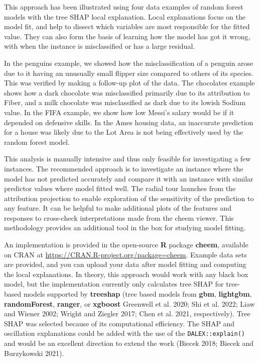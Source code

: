 \documentclass[11pt,twoside]{article}
\begin{document}
This approach has been illustrated using four data examples of random forest models with the tree SHAP local explanation. Local explanations focus on the model fit, and help to dissect which variables are most responsible for the fitted value. They can also form the basis of learning how the model has got it wrong, with when the instance is misclassified or has a large residual.

In the penguins example, we showed how the misclassification of a penguin arose due to it having an unusually small flipper size compared to others of its species. This was verified by making a follow-up plot of the data. The chocolates example shows how a dark chocolate was misclassified primarily due to its attribution to Fiber, and a milk chocolate was misclassified as dark due to its lowish Sodium value. In the FIFA example, we show how low Messi's salary would be if it depended on defensive skills. In the Ames housing data, an inaccurate prediction for a house was likely due to the Lot Area is not being effectively used by the random forest model.

This analysis is manually intensive and thus only feasible for investigating a few instances. The recommended approach is to investigate an instance where the model has not predicted accurately and compare it with an instance with similar predictor values where model fitted well. The radial tour launches from the attribution projection to enable exploration of the sensitivity of the prediction to any feature. It can be helpful to make additional plots of the features and responses to cross-check interpretations made from the cheem viewer. This methodology provides an additional tool in the box for studying model fitting.

An implementation is provided in the open-source \textbf{R} package \textbf{cheem}, available on CRAN at \url{https://CRAN.R-project.org/package=cheem}. Example data sets are provided, and you can upload your data after model fitting and computing the local explanations. In theory, this approach would work with any black box model, but the implementation currently only calculates tree SHAP for tree-based models supported by \textbf{treeshap} (tree based models from \textbf{gbm}, \textbf{lightgbm}, \textbf{randomForest}, \textbf{ranger}, or \textbf{xgboost} Greenwell et al. 2020; Shi et al. 2022; Liaw and Wiener 2002; Wright and Ziegler 2017; Chen et al. 2021, respectively). Tree SHAP was selected because of its computational efficiency. The SHAP and oscillation explanations could be added with the use of the \texttt{DALEX::explain()} and would be an excellent direction to extend the work (Biecek 2018; Biecek and Burzykowski 2021).
\end{document}
